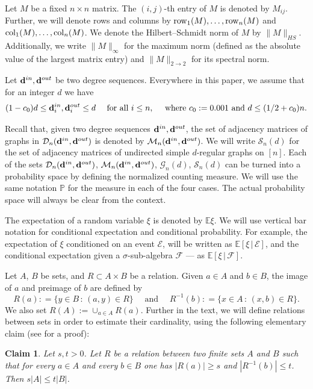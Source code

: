 \documentclass[12pt]{article}
\newtheorem{claim}[theorem]{Claim}
\theoremstyle{definition}
\theoremstyle{plain}
\newcommand{\E}{\mathbb{E}}
\newcommand{\Event}{\mathcal{E}}
\def\Prob{{\mathbb P}}
\def\InDeg{{\bf d}^{in}}
\def\OutDeg{{\bf d}^{out}}
\def\DGraphSet{{\mathcal D}_n}
\def\UGraphSet{{\mathcal G}_{n}}
\def\MatrixSet{{\mathcal M}_n}
\def\SymMatrixSet{{\mathcal S}_n}
\def\Col{{\rm col}}
\def\Row{{\rm row}}
\begin{document}
Let $M$ be a fixed $n\times n$ matrix.
The $(i,j)$-th entry of $M$ is denoted by $M_{ij}$.
Further, we will denote rows and columns by $\Row_1(M),\ldots,\Row_n(M)$ and $\Col_1(M),\ldots,\Col_n(M)$.
We denote the Hilbert--Schmidt norm of $M$ by $\|M\|_{HS}$.
Additionally, we write $\|M\|_\infty$ for the maximum norm (defined as the absolute value of the
largest matrix entry) and $\|M\|_{2\to 2}$ for its spectral norm.

\medskip

Let $\InDeg,\OutDeg$ be two degree sequences.
Everywhere in this paper, we assume that for an integer $d$ we have
\begin{equation}\label{eq: degree condition}
(1-c_0) d\leq\InDeg_i,\OutDeg_i\leq d\quad\mbox{ for all }i\leq n,\quad\mbox{ where }
c_0:=0.001\mbox{ and }d\leq (1/2+c_0)n.
\end{equation}

Recall that, given two degree sequences $\InDeg, \OutDeg$,
the set of adjacency matrices of graphs in $\DGraphSet(\InDeg, \OutDeg)$
is denoted by $\MatrixSet(\InDeg, \OutDeg)$.
We will write $\SymMatrixSet(d)$
for the set of adjacency matrices of undirected simple $d$-regular graphs on $[n]$.
Each of the sets $\DGraphSet(\InDeg, \OutDeg)$, $\MatrixSet(\InDeg, \OutDeg)$, $\UGraphSet(d)$, 
$\SymMatrixSet(d)$ can be turned into a probability space by defining the normalized counting measure.
We will use the same notation $\Prob$ for the measure in each of the four cases. The actual probability space
will always be clear from the context.

\medskip

The expectation of a random variable $\xi$ is denoted by $\E\xi$. We will
use vertical bar notation for conditional expectation and conditional probability. For example, the expectation of $\xi$
conditioned on an event $\Event$, will be written as $\E[\xi\,|\,\Event]$, and
the conditional expectation given a $\sigma$-sub-algebra $\mathcal F$ --- as
$\E[\xi\,|\,\mathcal F]$.

\bigskip

Let $A$, $B$ be sets, and $R\subset A\times B$ be a relation.
Given $a\in A$ and $b\in B$, the image of $a$ and preimage of $b$ are defined by
$$
R(a): = \{ y \in B \, : \, (a,y)  \in  R\} \quad \mbox{ and } \quad
R^{-1}(b): = \{ x \in A \, : \, (x,b)  \in  R\}.
$$
We also set $R(A):=\cup _{a\in A} R(a)$.
Further in the text, we will define relations between sets in order to estimate their cardinality,
using the following elementary claim (see \cite{LLTTY} for a proof):
\begin{claim} \label{multi-al}
Let $s, t >0$.
Let $R$ be a relation between two finite sets $A$ and $B$ such that for
every $a\in A$ and every $b\in B$ one has $|R(a)|\geq s$ and $|R^{-1}(b)|\leq t$.
Then $s |A|\leq  t |B|$.
\end{claim}
\end{document}
